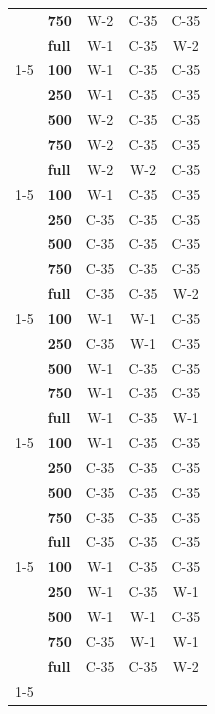 \begin{table}[t]
\begin{tabular}{llccc}
\textbf{} & \textbf{750} & W-2 & C-35 & C-35 \\
\textbf{} & \textbf{full} & W-1 & C-35 & W-2 \\
\cline{1-5}
\multirow[t]{5}{*}{\textbf{Hausa}} & \textbf{100} & W-1 & C-35 & C-35 \\
\textbf{} & \textbf{250} & W-1 & C-35 & C-35 \\
\textbf{} & \textbf{500} & W-2 & C-35 & C-35 \\
\textbf{} & \textbf{750} & W-2 & C-35 & C-35 \\
\textbf{} & \textbf{full} & W-2 & W-2 & C-35 \\
\cline{1-5}
\multirow[t]{5}{*}{\textbf{Igbo}} & \textbf{100} & W-1 & C-35 & C-35 \\
\textbf{} & \textbf{250} & C-35 & C-35 & C-35 \\
\textbf{} & \textbf{500} & C-35 & C-35 & C-35 \\
\textbf{} & \textbf{750} & C-35 & C-35 & C-35 \\
\textbf{} & \textbf{full} & C-35 & C-35 & W-2 \\
\cline{1-5}
\multirow[t]{5}{*}{\textbf{Yoruba}} & \textbf{100} & W-1 & W-1 & C-35 \\
\textbf{} & \textbf{250} & C-35 & W-1 & C-35 \\
\textbf{} & \textbf{500} & W-1 & C-35 & C-35 \\
\textbf{} & \textbf{750} & W-1 & C-35 & C-35 \\
\textbf{} & \textbf{full} & W-1 & C-35 & W-1 \\
\cline{1-5}
\multirow[t]{5}{*}{\textbf{Oromo}} & \textbf{100} & W-1 & C-35 & C-35 \\
\textbf{} & \textbf{250} & C-35 & C-35 & C-35 \\
\textbf{} & \textbf{500} & C-35 & C-35 & C-35 \\
\textbf{} & \textbf{750} & C-35 & C-35 & C-35 \\
\textbf{} & \textbf{full} & C-35 & C-35 & C-35 \\
\cline{1-5}
\multirow[t]{5}{*}{\textbf{Nig. Pidgin}} & \textbf{100} & W-1 & C-35 & C-35 \\
\textbf{} & \textbf{250} & W-1 & C-35 & W-1 \\
\textbf{} & \textbf{500} & W-1 & W-1 & C-35 \\
\textbf{} & \textbf{750} & C-35 & W-1 & W-1 \\
\textbf{} & \textbf{full} & C-35 & C-35 & W-2 \\
\cline{1-5}
\bottomrule
\end{tabular}
\end{table}
